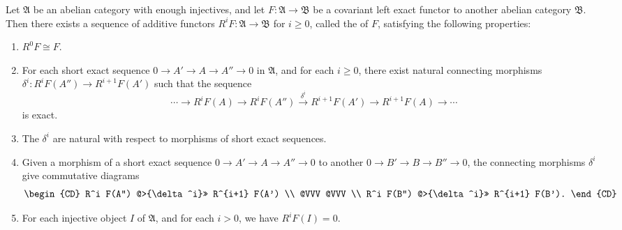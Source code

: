 Let $\mathfrak{A}$ be an abelian category with enough injectives, and let $F: \mathfrak{A} \to \mathfrak{B}$ be a covariant left exact functor to another abelian category $\mathfrak{B}$. Then there exists a sequence of additive functors $R^i F: \mathfrak{A} \to \mathfrak{B}$ for $i \geqslant 0$, called the  of $F$, satisfying the following properties:

\begin{enumerate}
\item[(a)] $R^0 F \cong F$.
\item[(b)] For each short exact sequence $0 \to A' \to A \to A'' \to 0$ in $\mathfrak{A}$, and for each $i \geqslant 0$, there exist natural connecting morphisms $\delta^i: R^i F(A'') \to R^{i+1} F(A')$ such that the sequence
$$\cdots \to R^i F(A) \to R^i F(A'') \xrightarrow{\delta^i} R^{i+1} F(A') \to R^{i+1} F(A) \to \cdots$$
is exact.
\item[(c)] The $\delta^i$ are natural with respect to morphisms of short exact sequences.
\item[(d)] Given a morphism of a short exact sequence $0 \to A' \to A \to A'' \to 0$ to another $0 \to B' \to B \to B'' \to 0$, the connecting morphisms $\delta^i$ give commutative diagrams
$$ \begin{CD} R^i F(A'') @>{\delta^i}>> R^{i+1} F(A') \\ @VVV @VVV \\ R^i F(B'') @>{\delta^i}>> R^{i+1} F(B'). \end{CD} $$
\item[(e)] For each injective object $I$ of $\mathfrak{A}$, and for each $i > 0$, we have $R^i F(I) = 0$.
\end{enumerate}
